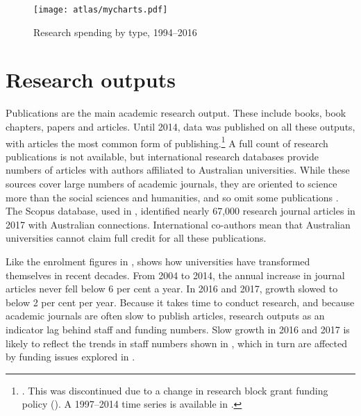 \documentclass{grattan}
\begin{document}
    \begin{figure} %
    \caption{Research spending by type, 1994--2016}\label{fig:research-spending-by-type-19942016}
    \texttt{[image: atlas/mycharts.pdf]}
    \end{figure}

%
\section{Research outputs}\label{sec:research-outputs}

Publications are the main academic research output. These include books, book chapters, papers and articles. Until 2014, data was published on all these outputs, with articles the most common form of publishing.\footnote{\textcite[][]{DepartmentofEducationandTraining2015researchincomeand}. This was discontinued due to a change in research block grant funding policy (). A 1997--2014 time series is available in \textcite[][40]{Norton2016mappingaustralian}.} A full count of research publications is not available, but international research databases provide numbers of articles with authors affiliated to Australian universities. While these sources cover large numbers of academic journals, they are oriented to science more than the social sciences and humanities, and so omit some publications . The Scopus database, used in , identified nearly 67,000 research journal articles in 2017 with Australian connections. International co-authors mean that Australian universities cannot claim full credit for all these publications.

Like the enrolment figures in ,  shows how universities have transformed themselves in recent decades. From 2004 to 2014, the annual increase in journal articles never fell below 6 per cent a year. In 2016 and 2017, growth slowed to below 2 per cent per year. Because it takes time to conduct research, and because academic journals are often slow to publish articles, research outputs as an indicator lag behind staff and funding numbers. Slow growth in 2016 and 2017 is likely to reflect the trends in staff numbers shown in , which in turn are affected by funding issues explored in .
\end{document}
